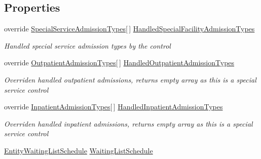 \subsection*{Properties}
\begin{DoxyCompactItemize}
\item 
override \hyperlink{class_general_health_care_elements_1_1_treatment_admission_types_1_1_special_service_admission_types}{Special\+Service\+Admission\+Types}\mbox{[}$\,$\mbox{]} \hyperlink{class_general_health_care_elements_1_1_special_facility_1_1_control_unit_special_service_model_a0cd44adb35b7faf39ad9ea7fa1c43a5e}{Handled\+Special\+Facility\+Admission\+Types}
\begin{DoxyCompactList}\small\item\em Handled special service admission types by the control \end{DoxyCompactList}\item 
override \hyperlink{class_general_health_care_elements_1_1_treatment_admission_types_1_1_outpatient_admission_types}{Outpatient\+Admission\+Types}\mbox{[}$\,$\mbox{]} \hyperlink{class_general_health_care_elements_1_1_special_facility_1_1_control_unit_special_service_model_a666f805c7e2c9caaf5da6a5a57593b2d}{Handled\+Outpatient\+Admission\+Types}
\begin{DoxyCompactList}\small\item\em Overriden handled outpatient admissions, returns empty array as this is a special service control \end{DoxyCompactList}\item 
override \hyperlink{class_general_health_care_elements_1_1_treatment_admission_types_1_1_inpatient_admission_types}{Inpatient\+Admission\+Types}\mbox{[}$\,$\mbox{]} \hyperlink{class_general_health_care_elements_1_1_special_facility_1_1_control_unit_special_service_model_aa10d9fef390e3a7471a783543b90fced}{Handled\+Inpatient\+Admission\+Types}
\begin{DoxyCompactList}\small\item\em Overriden handled inpatient admissions, returns empty array as this is a special service control \end{DoxyCompactList}\item 
\hyperlink{class_general_health_care_elements_1_1_booking_models_1_1_entity_waiting_list_schedule}{Entity\+Waiting\+List\+Schedule} \hyperlink{class_general_health_care_elements_1_1_special_facility_1_1_control_unit_special_service_model_a9dd3b95fa748793c37ae5fe94ce5819f}{Waiting\+List\+Schedule}

\end{DoxyCompactItemize}
